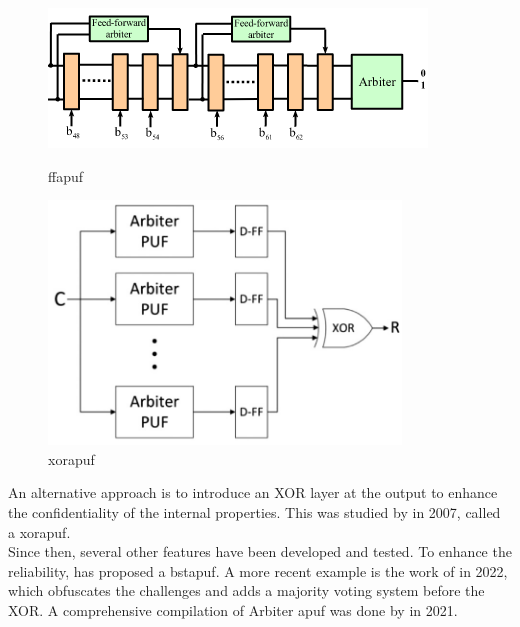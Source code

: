\begin{figure}[H]
   \begin{minipage}[b]{0.6\linewidth} 
        \centering
        \includegraphics[width=\linewidth]{images/FF-APUF_Lee and al 2004.png}
        \caption{\acrshort{ffapuf} \cite{lee_technique_2004}}
        \label{FFAPUF}
   \end{minipage}\hfill
   \begin{minipage}[b]{0.35\linewidth}   
        \centering
        \includegraphics[width=\linewidth]{images/XOR-APUF Al-Hajj and al. 2021.png}
        \caption{\acrshort{xorapuf} \cite{el-hajj_taxonomy_2021}}
         \label{XORAPUF}
   \end{minipage}
\end{figure}

An alternative approach is to introduce an XOR layer at the output to enhance the confidentiality of the internal properties. This was studied by \cite{suh_physical_2007} in 2007, called a \acrfull{xorapuf}.\\

Since then, several other features have been developed and tested. To enhance the reliability, \cite{he_highly_2020} has proposed a \acrfull{bstapuf}. A more recent example is the work of \cite{anandakumar_implementation_2022} in 2022, which obfuscates the challenges and adds a majority voting system before the XOR. A comprehensive compilation of Arbiter \acrshort{apuf} was done by \cite{el-hajj_taxonomy_2021} in 2021.



